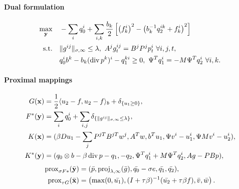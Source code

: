 \paragraph{Dual formulation}
\begin{align*}
    \max_{\mathbf{y}} \quad
        & -\sum_i q_0^i+ \sum_{i,k} \frac{b_k}{2} \left [
                \left(f_k^i\right)^2
                - \left(b_k^{-1} q_2^{ik} + f_k^i\right)^2
            \right ] \\
    \text{s.t.}\quad
        & \|g^{ij}\|_{\sigma,\infty} \leq \lambda,
          ~A^j g^{ij}_t = B^j P^j p^i_t ~\forall i,j,t, \\
        & q_0^i b^k - b_k (\operatorname{div} p^k)^i - q_1^{ki} \geq 0,
          ~\Psi^T q_1^i = -M \Psi^T q_2^i ~\forall i,k.
\end{align*}

\paragraph{Proximal mappings}
\begin{align*}
    G(\mathbf{x}) &= \frac{1}{2} \langle u_2-f, u_2-f \rangle_b
        + \delta_{\{u_1 \geq 0\}}, \\
    F^*(\mathbf{y}) &= \sum_{i} q_0^i
        + \sum_{i,j} \delta_{\{\|g^{ij}\|_{\sigma,\infty} \leq \lambda\}}, \\
    K(\mathbf{x}) &= (
        \beta Du_1 - \sum_j P^{jT}B^{jT}w^{j},
        A^T w,
        b^T u_1,
        \Psi v^i - u_1^i,
        \Psi M v^i - u_2^i
    ), \\
    K^*(\mathbf{y}) &= (
        q_0 \otimes b - \beta \operatorname{div}{p} - q_1,
        -q_2,
        \Psi^T q_1^i + M \Psi^T q_2^i,
        A g - PBp
    ),
\end{align*}
\begin{align*}
    \operatorname{prox}_{\sigma F*}(\bar{\mathbf{y}})
    &= (
        \bar{p},
        \operatorname{proj}_{\lambda,\infty}(\bar{g}),
        \bar{q_0}-\sigma e,
        \bar{q_1},
        \bar{q_2}
    ), \\
    \operatorname{prox}_{\tau G}(\bar{\mathbf{x}})
    &= \left(
        \max(0,\bar{u_1}),
        (I+\tau \beta)^{-1}(\bar{u_2} + \tau \beta f),
        \bar{v},
        \bar{w}
    \right).
\end{align*}

